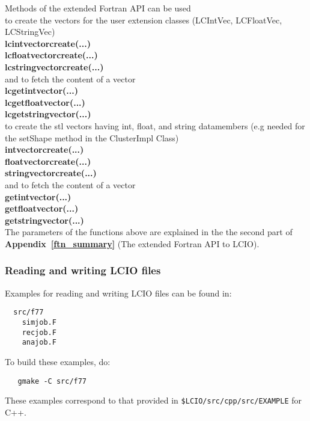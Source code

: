 Methods of the extended Fortran API can be used\\

to create the vectors for the user extension classes (LCIntVec, LCFloatVec, LCStringVec)\\
 {\bf lcintvectorcreate(...)} \\
 {\bf lcfloatvectorcreate(...)} \\
 {\bf lcstringvectorcreate(...)} \\

and to fetch the content of a vector\\
 {\bf lcgetintvector(...)} \\
 {\bf lcgetfloatvector(...)} \\
 {\bf lcgetstringvector(...)} \\

to create the stl vectors having int, float, and string datamembers
(e.g needed for the setShape method in the ClusterImpl Class)\\
 {\bf intvectorcreate(...)} \\
 {\bf floatvectorcreate(...)} \\
 {\bf stringvectorcreate(...)} \\

and to fetch the content of a vector\\
 {\bf getintvector(...)} \\
 {\bf getfloatvector(...)} \\
 {\bf getstringvector(...)} \\

The parameters of the functions above are explained in 
the the second part of {\bf Appendix~\ref{ftn_summary} }
(The extended Fortran API to LCIO).

\subsubsection{Reading and writing LCIO files}

Examples for reading and writing LCIO files can be found in:
\begin{verbatim}
  src/f77
    simjob.F
    recjob.F
    anajob.F
\end{verbatim}
To build these examples, do:
\begin{verbatim}
   gmake -C src/f77
\end{verbatim}

These examples correspond to that provided in \verb#$LCIO/src/cpp/src/EXAMPLE# for C++. \\
                                                                                       
